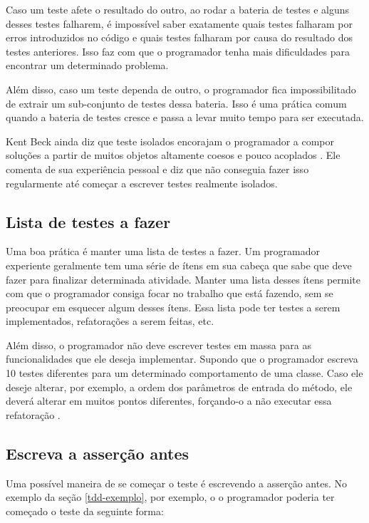 Caso um teste afete o resultado do outro, ao rodar a bateria de testes e alguns desses testes falharem, é impossível
saber exatamente quais testes falharam por erros introduzidos no código e quais testes falharam por causa do resultado
dos testes anteriores. Isso faz com que o programador tenha mais dificuldades para encontrar um determinado problema.

Além disso, caso um teste dependa de outro, o programador fica impossibilitado de extrair um sub-conjunto de testes dessa
bateria. Isso é uma prática comum quando a bateria de testes cresce e passa a levar muito tempo para ser executada.

Kent Beck ainda diz que teste isolados encorajam o programador a compor soluções a partir de muitos objetos altamente coesos
e pouco acoplados \cite{TDDByExample}. Ele comenta de sua experiência pessoal e diz que não conseguia fazer isso regularmente até
começar a escrever testes realmente isolados. 

\subsection{Lista de testes a fazer}

Uma boa prática é manter uma lista de testes a fazer. Um programador experiente geralmente tem uma série de ítens em sua cabeça
que sabe que deve fazer para finalizar determinada atividade. Manter uma lista desses ítens permite com que o programador 
consiga focar no trabalho que está fazendo, sem se preocupar em esquecer algum desses ítens. 
Essa lista pode ter testes a serem implementados, refatorações a serem feitas, etc. 

Além disso, o programador não deve escrever testes em massa para as funcionalidades que ele deseja implementar. Supondo que o programador
escreva 10 testes diferentes para um determinado comportamento de uma classe. Caso ele deseje alterar, por exemplo, a ordem dos parâmetros
de entrada do método, ele deverá alterar em muitos pontos diferentes, forçando-o a não executar essa refatoração \cite{TDDByExample}.

\subsection{Escreva a asserção antes}

Uma possível maneira de se começar o teste é escrevendo a asserção antes. No exemplo da seção \ref{tdd-exemplo}, por exemplo, o 
o programador poderia ter começado o teste da seguinte forma:


